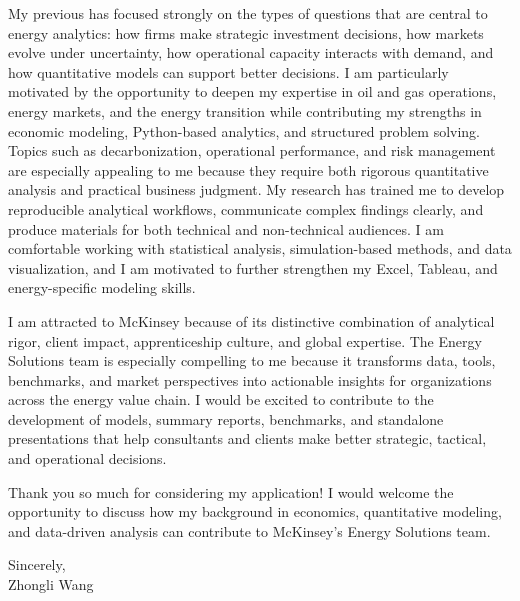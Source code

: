 \documentclass[11pt]{article}
\begin{document}
My previous has focused strongly on the types of questions that are central to energy analytics: how firms make strategic investment decisions, how markets evolve under uncertainty, how operational capacity interacts with demand, and how quantitative models can support better decisions. I am particularly motivated by the opportunity to deepen my expertise in oil and gas operations, energy markets, and the energy transition while contributing my strengths in economic modeling, Python-based analytics, and structured problem solving. Topics such as decarbonization, operational performance, and risk management are especially appealing to me because they require both rigorous quantitative analysis and practical business judgment.
My research has trained me to develop reproducible analytical workflows, communicate complex findings clearly, and produce materials for both technical and non-technical audiences. I am comfortable working with statistical analysis, simulation-based methods, and data visualization, and I am motivated to further strengthen my Excel, Tableau, and energy-specific modeling skills.

I am attracted to McKinsey because of its distinctive combination of analytical rigor, client impact, apprenticeship culture, and global expertise. The Energy Solutions team is especially compelling to me because it transforms data, tools, benchmarks, and market perspectives into actionable insights for organizations across the energy value chain. I would be excited to contribute to the development of models, summary reports, benchmarks, and standalone presentations that help consultants and clients make better strategic, tactical, and operational decisions.

Thank you so much for considering my application! I would welcome the opportunity to discuss how my background in economics, quantitative modeling, and data-driven analysis can contribute to McKinsey's Energy Solutions team.

\vspace{0.15cm}

\noindent Sincerely, \\[0.5cm]
\noindent Zhongli Wang
\end{document}
